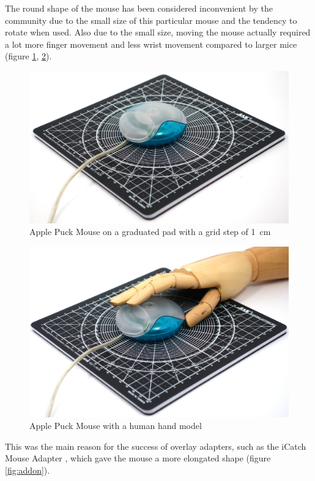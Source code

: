 \documentclass[11pt, a4paper]{article}
\begin{document}
The round shape of the mouse has been considered inconvenient by the community due to the small size of this particular mouse and the tendency to rotate when used.
Also due to the small size, moving the mouse actually required a lot more finger movement and less wrist movement compared to larger mice (figure \ref{fig:size}, \ref{fig:hand}).

\begin{figure}[h]
    \centering
    \includegraphics[scale=0.4]{1998_apple_puck/appleset60.jpg}
    \caption{Apple Puck Mouse on a graduated pad with a grid step of 1~cm}
    \label{fig:size}
\end{figure}

\begin{figure}[h]
    \centering
    \includegraphics[scale=0.4]{1998_apple_puck/appleset62.jpg}
    \caption{Apple Puck Mouse with a human hand model}
    \label{fig:hand}
\end{figure}

This was the main reason for the success of overlay adapters, such as the iCatch Mouse Adapter \cite{icatch}, which gave the mouse a more elongated shape (figure \ref{fig:addon}).
\end{document}
